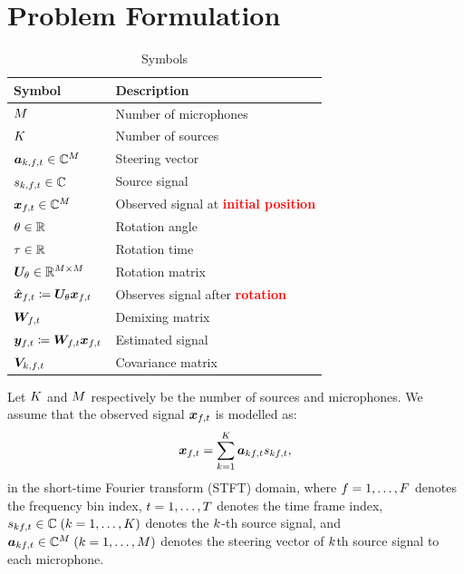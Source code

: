 \documentclass[sip,biber]{now-journal}
\begin{document}
\section{Problem Formulation}
\begin{table}[t]
  \centering
  \caption{Symbols}
  \begin{tabular}{ll}
    \toprule
      Symbol & Description \\
    \midrule
      $M$                                                     & Number of microphones \\
      $K$                                                     & Number of sources \\
      $\steer _{\src,\ft} \in \C ^{\Mic}$                        & Steering vector \\
      $\sig _{\src,\ft} \in \C$                                  & Source signal \\
      $\Obs _{\ft} \in \C^{\Mic}$                                & Observed signal at \textcolor{red}{\textbf{initial position}} \\
      $\theta \in \mathbb{R}$                                           & Rotation angle \\
      $\tau \in \mathbb{R}$                                           & Rotation time \\
      $\bm{U} _{\theta} \in \mathbb{R} ^{M \times M}$            & Rotation matrix \\
      $\rotObs _{\ft} \coloneqq \rotMat _{\rotDeg} \Obs _{\ft}$  & Observes signal after \textcolor{red}{\textbf{rotation}} \\
      $\Demix _{\ft}$                                            & Demixing matrix \\
      $\Est _{\ft} \coloneqq \Demix _{\ft} \Obs _{\ft}$          & Estimated signal \\
      $\cov _{\src,\ft}$                                         & Covariance matrix \\
    \bottomrule
  \end{tabular}
\end{table}

Let $K$ and $M$ respectively be the number of sources and microphones.
We assume that the observed signal $\Obs _{\ft}$ is modelled as:
\begin{equation}
  \Obs _{\ft} = \sum _{\src=1} ^{\Src} \steer _{\src\ft} \sig _{\src\ft},
\end{equation}
in the short-time Fourier transform (STFT) domain,
where $f = 1, \dots, F$ denotes the frequency bin index,
$t = 1, \dots, T$ denotes the time frame index,
$\sig _{\src\ft} \in \C\; (\src = 1, \dots, \Src)$ denotes the $k$-th source signal, and
$\steer _{\src\ft} \in \C ^{\Mic}\; (\src = 1, \dots, \Mic)$ denotes the steering vector of $k$th source signal to each microphone.
\end{document}
